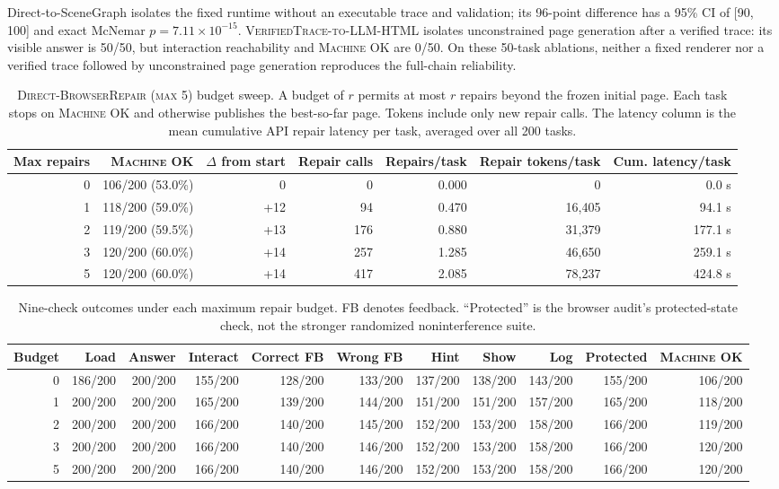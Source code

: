 \documentclass[letterpaper]{article}
\newcommand{\machineok}{\textsc{Machine OK}}
\newcommand{\dbr}{\textsc{Direct-BrowserRepair (max 5)}}
\newcommand{\vtllm}{\textsc{VerifiedTrace-to-LLM-HTML}}
\begin{document}
Direct-to-SceneGraph isolates the fixed runtime without an executable trace and validation; its 96-point difference has a 95\% CI of [90, 100] and exact McNemar $p=7.11\times10^{-15}$. \vtllm{} isolates unconstrained page generation after a verified trace: its visible answer is 50/50, but interaction reachability and \machineok{} are 0/50. On these 50-task ablations, neither a fixed renderer nor a verified trace followed by unconstrained page generation reproduces the full-chain reliability.

\begin{table}[t]
\centering
\scriptsize
\setlength{\tabcolsep}{5pt}
\begin{tabular}{@{}rrrrrrr@{}}
\toprule
Max repairs & \machineok{} & $\Delta$ from start & Repair calls & Repairs/task & Repair tokens/task & Cum. latency/task \\
\midrule
0 & 106/200 (53.0\%) & 0 & 0 & 0.000 & 0 & 0.0 s \\
1 & 118/200 (59.0\%) & +12 & 94 & 0.470 & 16,405 & 94.1 s \\
2 & 119/200 (59.5\%) & +13 & 176 & 0.880 & 31,379 & 177.1 s \\
3 & 120/200 (60.0\%) & +14 & 257 & 1.285 & 46,650 & 259.1 s \\
5 & 120/200 (60.0\%) & +14 & 417 & 2.085 & 78,237 & 424.8 s \\
\bottomrule
\end{tabular}
\caption{\dbr{} budget sweep. A budget of \(r\) permits at most \(r\) repairs beyond the frozen initial page. Each task stops on \machineok{} and otherwise publishes the best-so-far page. Tokens include only new repair calls. The latency column is the mean cumulative API repair latency per task, averaged over all 200 tasks.}
\label{tab:repair-budget}
\end{table}

\begin{table}[t]
\centering
\scriptsize
\setlength{\tabcolsep}{3.1pt}
\begin{tabular}{@{}rrrrrrrrrrr@{}}
\toprule
Budget & Load & Answer & Interact & Correct FB & Wrong FB & Hint & Show & Log & Protected & \machineok{} \\
\midrule
0 & 186/200 & 200/200 & 155/200 & 128/200 & 133/200 & 137/200 & 138/200 & 143/200 & 155/200 & 106/200 \\
1 & 200/200 & 200/200 & 165/200 & 139/200 & 144/200 & 151/200 & 151/200 & 157/200 & 165/200 & 118/200 \\
2 & 200/200 & 200/200 & 166/200 & 140/200 & 145/200 & 152/200 & 153/200 & 158/200 & 166/200 & 119/200 \\
3 & 200/200 & 200/200 & 166/200 & 140/200 & 146/200 & 152/200 & 153/200 & 158/200 & 166/200 & 120/200 \\
5 & 200/200 & 200/200 & 166/200 & 140/200 & 146/200 & 152/200 & 153/200 & 158/200 & 166/200 & 120/200 \\
\bottomrule
\end{tabular}
\caption{Nine-check outcomes under each maximum repair budget. FB denotes feedback. ``Protected'' is the browser audit's protected-state check, not the stronger randomized noninterference suite.}
\label{tab:repair-budget-checks}
\end{table}
\end{document}
